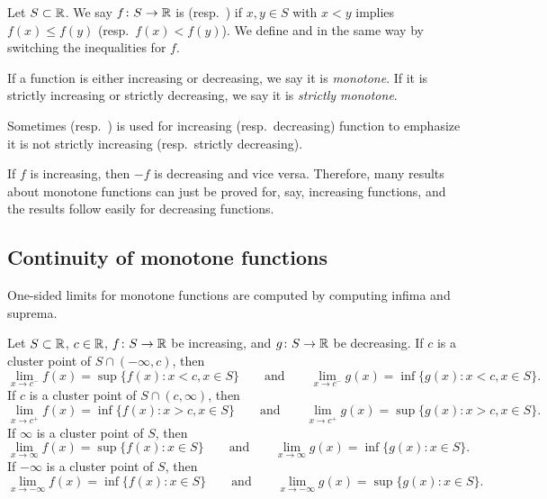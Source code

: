 
\begin{defn}
Let $S \subset {\mathbb{R}}$.
We say $f \colon S \to {\mathbb{R}}$ is \emph{}
(resp.\  \emph{}) if $x,y \in S$ with
$x < y$ implies $f(x) \leq f(y)$ (resp.\ $f(x) < f(y)$).
We define
\emph{} and
\emph{} in the same way by switching the
inequalities for $f$.

If a function is either increasing or decreasing, we say it is
\emph{monotone}.  If it is
strictly increasing or strictly decreasing, we say it is
\emph{strictly monotone}.
\end{defn}

Sometimes \emph{}
(resp.\ \emph{}) is used
for increasing (resp.\ decreasing) function to emphasize it is not
strictly increasing (resp.\ strictly decreasing).

If $f$ is increasing, then $-f$ is decreasing and vice versa.  Therefore,
many results about monotone functions can just be proved for, say, increasing
functions, and the results follow easily for decreasing functions.

\subsection{Continuity of monotone functions}

One-sided limits for monotone functions are computed
by computing infima and suprema.

\begin{prop} \label{prop:monotlimits}
Let $S \subset {\mathbb{R}}$, $c \in {\mathbb{R}}$,
$f \colon S \to {\mathbb{R}}$ be increasing,
and
$g \colon S \to {\mathbb{R}}$ be decreasing.
If $c$ is a cluster point of $S \cap (-\infty,c)$, then
\begin{equation*}
\lim_{x \to c^-} f(x) = \sup \{ f(x) : x < c, x \in S \}
\qquad \text{and} \qquad
\lim_{x \to c^-} g(x) = \inf \{ g(x) : x < c, x \in S \} .
\end{equation*}
If $c$ is a cluster point of $S \cap (c,\infty)$, then
\begin{equation*}
\lim_{x \to c^+} f(x) = \inf \{ f(x) : x > c, x \in S \}
\qquad \text{and} \qquad
\lim_{x \to c^+} g(x) = \sup \{ g(x) : x > c, x \in S \} .
\end{equation*}
If $\infty$ is a cluster point of $S$, then
\begin{equation*}
\lim_{x \to \infty} f(x) = \sup \{ f(x) : x \in S \}
\qquad \text{and} \qquad
\lim_{x \to \infty} g(x) = \inf \{ g(x) : x \in S \} .
\end{equation*}
If $-\infty$ is a cluster point of $S$, then
\begin{equation*}
\lim_{x \to -\infty} f(x) = \inf \{ f(x) : x \in S \}
\qquad \text{and} \qquad
\lim_{x \to -\infty} g(x) = \sup \{ g(x) : x \in S \} .
\end{equation*}
\end{prop}

